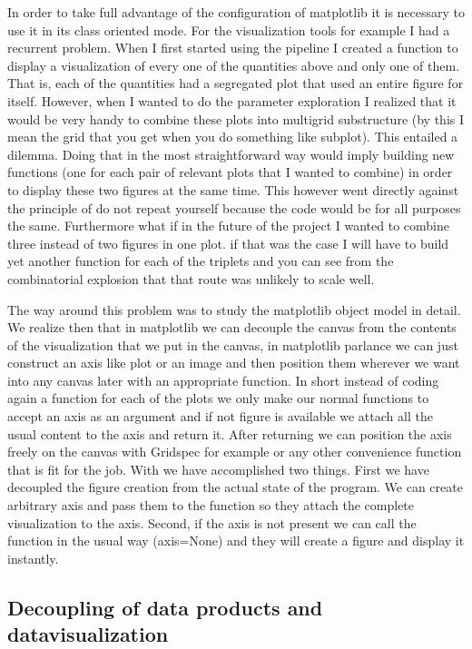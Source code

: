 \documentclass[11pt,a4paper]{article}
\begin{document}
In order to take full advantage of the configuration of matplotlib it is
necessary to use it in its class oriented mode. For the visualization
tools for example I had a recurrent problem. When I first started
using the pipeline I created a function to display a visualization of every one of the
quantities above and only one of them. That is, each of the quantities had a segregated plot that used an entire figure for itself. However, when I wanted to do the
parameter exploration I realized that it would be very handy to combine
these plots into multigrid substructure (by this I mean the grid that
you get when you do something like subplot). This entailed a dilemma. Doing
that in the most straightforward way would imply building new functions
(one for each pair of relevant plots that I wanted to combine) in order
to display these two figures at the same time. This however went
directly against the principle of do not repeat yourself because the code would be for all purposes the same. Furthermore
what if in the future of the project I wanted to combine three instead of two figures
in one plot. if that was the case I will have to build yet another
function for each of the triplets and you can see from the combinatorial
explosion that that route was unlikely to scale well.

The way around this problem was to study the matplotlib object
model in detail. We realize then that in matplotlib we can decouple
the canvas from the contents of the visualization that we put in the canvas, in
matplotlib parlance we can just construct an axis like plot or an image
and then position them wherever we want into any canvas later with an
appropriate function. In short instead of coding again a function for
each of the plots we only make our normal functions to accept an axis as
an argument and if not figure is available we attach all the usual
content to the axis and return it. After returning we can position the
axis freely on the canvas with Gridspec for example or any other
convenience function that is fit for the job. With we have accomplished two things. First we have decoupled the figure creation from the actual state of the program. We can create arbitrary axis and pass them to the function so they attach the complete visualization to the axis. Second, if the axis is not present we can call the function in the usual way (axis=None) and they will create a figure and display it instantly.

\subsection{Decoupling of data products and datavisualization}\label{decoupling-of-data-products-and-data-visualization}
\end{document}
